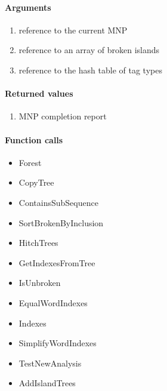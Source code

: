 \paragraph{Arguments}
\begin{enumerate}
\item reference to the current MNP
\item reference to an array of broken islands
\item reference to the hash table of tag types
\end{enumerate}

\paragraph{Returned values}
\begin{enumerate}
\item MNP completion report
\end{enumerate}

\paragraph{Function calls}
\begin{itemize}
\item Forest
\item CopyTree
\item ContainsSubSequence
\item SortBrokenByInclusion
\item HitchTrees
\item GetIndexesFromTree
\item IsUnbroken
\item EqualWordIndexes
\item Indexes
\item SimplifyWordIndexes
\item TestNewAnalysis
\item AddIslandTrees
\end{itemize}

